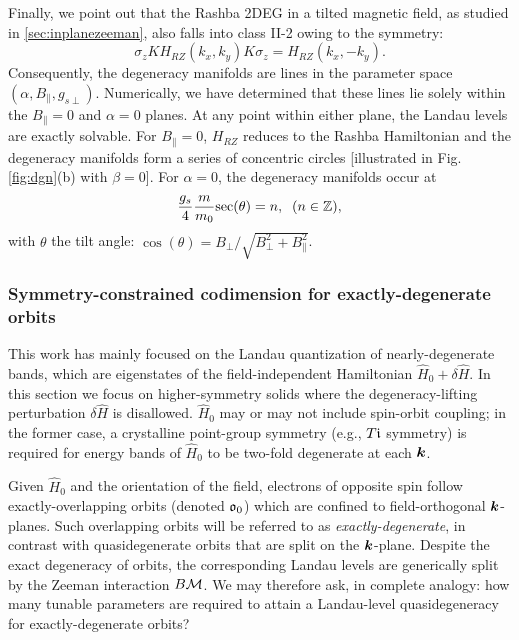 \documentclass[aps, showpacs, twocolumn, notitlepage, superscriptaddress]{revtex4-1}
\begin{document}
Finally, we point out that the Rashba 2DEG in a tilted magnetic field, as studied in \ref{sec:inplanezeeman}, also falls into class II-2  owing to the symmetry:
\begin{equation}
\sigma_z K H_{RZ}(k_x, k_y) K \sigma_z=H_{RZ}(k_x, -k_y).
\end{equation}
Consequently, the degeneracy manifolds are lines in the parameter space $(\alpha, B_\parallel, g_{s\perp})$. Numerically, we have determined that these lines lie solely within the $B_\parallel=0$ and $\alpha=0$ planes. At any point within either plane,  the Landau levels are exactly solvable. For $B_\parallel=0$, $H_{RZ}$ reduces to the Rashba Hamiltonian and the degeneracy manifolds form a series of concentric circles [illustrated in Fig. \ref{fig:dgn}(b) with $\beta=0$]. For $\alpha=0$, the degeneracy manifolds occur at
\begin{equation}
    \frac{g_s}{4} \frac{ m}{ m_0}\text{sec}(\theta)=n,\;\;(n\in\mathbb{Z}),
\end{equation}
with $\theta$ the tilt angle: $\cos(\theta)=B_\perp/\sqrt{B_\perp^2+B_\parallel^2}$. 

\subsubsection{Symmetry-constrained codimension for exactly-degenerate orbits}\label{sec:codimexactdeg}

This work has mainly focused on the Landau quantization of nearly-degenerate bands, which are eigenstates of the field-independent Hamiltonian $\hat{H}_0{+}\delta \hat{H}$. In this section we focus on higher-symmetry solids where the degeneracy-lifting perturbation $\delta \hat{H}$ is disallowed. $\hat{H}_0$ may or may not include spin-orbit coupling; in the former case, a crystalline point-group symmetry (e.g., $T\mathfrak{i}$ symmetry) is required for energy bands of $\hat{H}_0$ to be two-fold degenerate at each $\boldsymbol{k}$.

Given $\hat{H}_0$ and the orientation of the field, electrons of opposite spin follow exactly-overlapping orbits (denoted $\mathfrak{o}_0$) which are confined to field-orthogonal $\boldsymbol{k}$-planes. Such overlapping orbits will be referred to as \textit{exactly-degenerate}, in contrast with quasidegenerate orbits that are split on the $\boldsymbol{k}$-plane. Despite the exact degeneracy of orbits, the corresponding Landau levels are generically split by the Zeeman interaction $B{\cal M}$. We may therefore ask, in complete analogy: how many tunable parameters are required to attain a Landau-level quasidegeneracy for exactly-degenerate orbits? 
\end{document}

